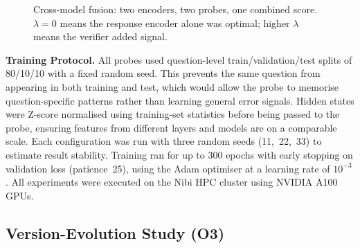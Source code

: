 \documentclass[12pt,twocolumn]{article}
\begin{document}
\begin{figure}[H]
\centering
{}
\caption{Cross-model fusion: two encoders, two probes, one combined
score. $\lambda = 0$ means the response encoder alone was optimal;
higher $\lambda$ means the verifier added signal.}
\label{fig:fusion}
\end{figure}

\textbf{Training Protocol.}
All probes used question-level train/validation/test splits of
80/10/10 with a fixed random seed. This prevents the same question from appearing in both training and
test, which would allow the probe to memorise question-specific
patterns rather than learning general error signals. Hidden states were Z-score normalised using training-set
statistics before being passed to the probe, ensuring features from
different layers and models are on a comparable scale. Each
configuration was run with three random seeds (11,~22,~33) to
estimate result stability. Training ran for up to 300 epochs with
early stopping on validation loss (patience~25), using the Adam
optimiser at a learning rate of $10^{-3}$. All experiments were
executed on the Nibi HPC cluster using NVIDIA A100 GPUs.

\subsection{Version-Evolution Study (O3)}
\label{sec:method-evo}
\end{document}
